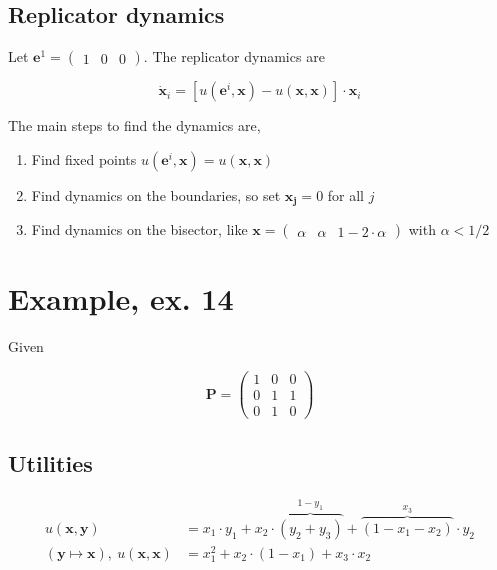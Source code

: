 \documentclass[american]{scrartcl}
\begin{document}
\subsection{Replicator dynamics}

Let $\bm{e}^1 = \begin{pmatrix}
        1 & 0 & 0
    \end{pmatrix}$. The replicator dynamics are

\begin{equation}
    \dot{\bm{x}}_i = \left[ u(\bm{e}^i, \bm{x}) - u(\bm{x}, \bm{x}) \right] \cdot \bm{x}_i
\end{equation}

The main steps to find the dynamics are,

\begin{enumerate}
    \item Find fixed points $u(\bm{e}^i, \bm{x}) = u(\bm{x}, \bm{x})$
    \item Find dynamics on the boundaries, so set $\bm{x_j} = 0$ for all $j$
    \item Find dynamics on the bisector, like $\bm{x} = \begin{pmatrix}
                  \alpha & \alpha & 1 - 2\cdot \alpha
              \end{pmatrix}$ with $\alpha < 1 / 2$
\end{enumerate}

\section{Example, ex. 14}

Given

\begin{equation}
    \bm{P} = \begin{pmatrix}
        1 & 0 & 0 \\
        0 & 1 & 1 \\
        0 & 1 & 0
    \end{pmatrix}
\end{equation}

\subsection{Utilities}

\begin{equation}
    \begin{split}
        u(\bm{x}, \bm{y}) &= x_1 \cdot y_1 + x_2 \cdot \overbrace{(y_2 + y_3)}^{1 - y_1} + \overbrace{(1 - x_1 - x_2)}^{x_3} \cdot y_2 \\
        (\bm{y} \mapsto \bm{x}), \ u(\bm{x}, \bm{x}) &= x_1^2  + x_2 \cdot (1 - x_1) + x_3 \cdot x_2
    \end{split}
\end{equation}
\end{document}
